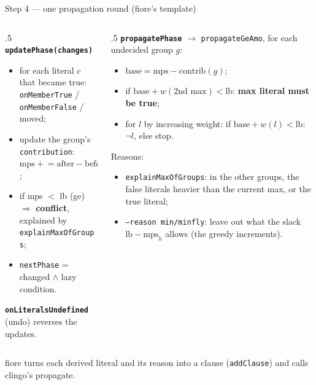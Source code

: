 \documentclass[aspectratio=169,11pt]{beamer}
\begin{document}
\begin{frame}{Step 4 --- one propagation round (fiore's template)}
\footnotesize
\begin{columns}[T]
\begin{column}{.5\textwidth}
\textbf{\texttt{updatePhase(changes)}}
\begin{itemize}\setlength\itemsep{1pt}
\item for each literal $c$ that became true:\\
  \texttt{onMemberTrue} / \texttt{onMemberFalse} / moved;
\item update the group's \texttt{contribution}:\\
  $\text{mps} \mathrel{+}= \text{after} - \text{before}$;
\item if mps $<$ lb (ge) $\Rightarrow$ \textbf{conflict},\\
  explained by \texttt{explainMaxOfGroups};
\item \texttt{nextPhase} = changed $\wedge$ lazy condition.
\end{itemize}
\textbf{\texttt{onLiteralsUndefined}} (undo) reverses the updates.
\end{column}
\begin{column}{.5\textwidth}
\textbf{\texttt{propagatePhase}} $\to$ \texttt{propagateGeAmo}, for each undecided group $g$:
\begin{itemize}\setlength\itemsep{1pt}
\item $\text{base} = \text{mps} - \text{contrib}(g)$;
\item if $\text{base} + w(\text{2nd max}) < \text{lb}$: \textbf{max literal must be true};
\item for $l$ by increasing weight: if $\text{base} + w(l) < \text{lb}$: \textbf{$\neg l$}, else stop.
\end{itemize}
Reasons:
\begin{itemize}\setlength\itemsep{1pt}
\item \texttt{explainMaxOfGroups}: in the other groups, the false literals heavier than the current max, or the true literal;
\item \texttt{--reason min/minfly}: leave out what the slack $\text{lb}-\text{mps}_h$ allows (the greedy increments).
\end{itemize}
\end{column}
\end{columns}
\vspace{1mm}
fiore turns each derived literal and its reason into a clause (\texttt{addClause}) and calls clingo's propagate.
\end{frame}
\end{document}
